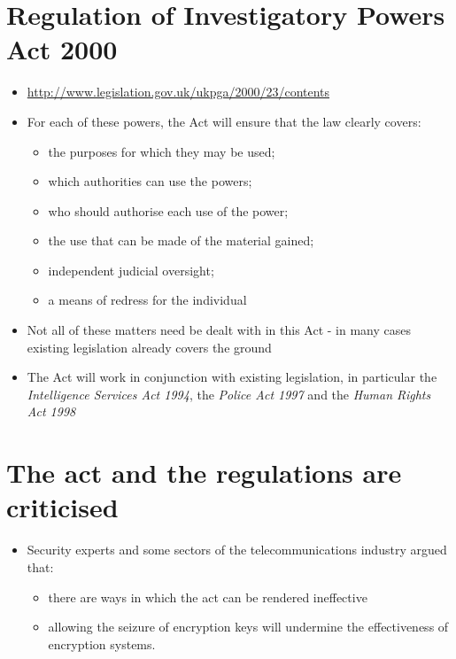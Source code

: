 \documentclass{article}
\begin{document}
\section{Regulation of Investigatory Powers Act 2000}
\begin{itemize}
\item \url{http://www.legislation.gov.uk/ukpga/2000/23/contents}
\item For each of these powers, the Act will ensure that the law clearly covers:
\begin{itemize}
\item the purposes for which they may be used;
\item which authorities can use the powers;
\item who should authorise each use of the power;
\item the use that can be made of the material gained;
\item independent judicial oversight;
\item a means of redress for the individual
\end{itemize}
\item Not all of these matters need be dealt with in this Act - in many cases existing legislation already covers the ground
\item The Act will work in conjunction with existing legislation, in particular the \emph{Intelligence Services Act 1994}, the \emph{Police Act 1997} and the \emph{Human Rights Act 1998}
\end{itemize}



\section{The act and the regulations are criticised}
\begin{itemize}
\item Security experts and some sectors of the telecommunications industry argued that:
\begin{itemize}
\item there are ways in which the act can be rendered ineffective
\item allowing the seizure of encryption keys will undermine the effectiveness of encryption systems.
\end{itemize}
\end{itemize}
\end{document}
